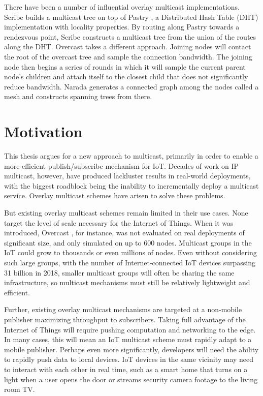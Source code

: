 There have been a number of influential overlay multicast implementations. Scribe \cite{scribe} builds a multicast tree on top of Pastry \cite{pastry}, a Distributed Hash Table (DHT) implementation with locality properties. By routing along Pastry towards a rendezvous point, Scribe constructs a multicast tree from the union of the routes along the DHT. Overcast \cite{overcast} takes a different approach. Joining nodes will contact the root of the overcast tree and sample the connection bandwidth. The joining node then begins a series of rounds in which it will sample the current parent node's children and attach itself to the closest child that does not significantly reduce bandwidth. Narada \cite{narada} generates a connected graph among the nodes called a mesh and constructs spanning trees from there.

\section{Motivation}
This thesis argues for a new approach to multicast, primarily in order to enable a more efficient publish/subscribe mechanism for IoT. Decades of work on IP multicast, however, have produced lackluster results in real-world deployments, with the biggest roadblock being the inability to incrementally deploy a multicast service. Overlay multicast schemes have arisen to solve these problems.

But existing overlay multicast schemes remain limited in their use cases. None target the level of scale necessary for the Internet of Things. When it was introduced, Overcast \cite{overcast}, for instance, was not evaluated on real deployments of significant size, and only simulated on up to 600 nodes. Multicast groups in the IoT could grow to thousands or even millions of nodes. Even without considering such large groups, with the number of Internet-connected IoT devices surpassing 31 billion \cite{ihs} in 2018, smaller multicast groups will often be sharing the same infrastructure, so multicast mechanisms must still be relatively lightweight and efficient.

Further, existing overlay multicast mechanisms are targeted at a non-mobile publisher maximizing throughput to subscribers. Taking full advantage of the Internet of Things will require pushing computation and networking to the edge. In many cases, this will mean an IoT multicast scheme must rapidly adapt to a mobile publisher. Perhaps even more significantly, developers will need the ability to rapidly push data to local devices. IoT devices in the same vicinity may need to interact with each other in real time, such as a smart home that turns on a light when a user opens the door or streams security camera footage to the living room TV. 


